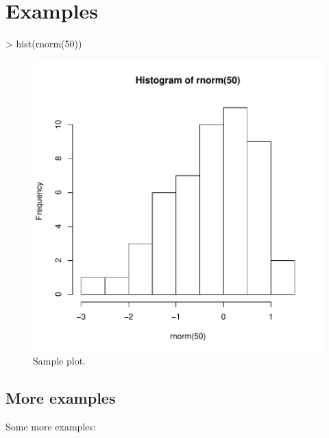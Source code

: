\documentclass{article}
\begin{document}
\section*{Examples}


\begin{Schunk}
\begin{Sinput}
> hist(rnorm(50))
\end{Sinput}
\end{Schunk}

\begin{figure}[h] %
\begin{center}
\includegraphics[width=5in]{pavo-fig1}
\end{center}
\caption{Sample plot.}
\label{fig1}
\end{figure}

\subsection*{More examples}

Some more examples:
\end{document}

